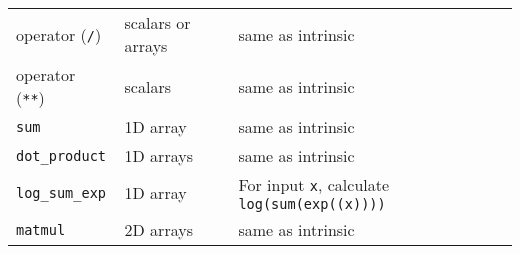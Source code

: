 \documentclass[12pt, reqno, oneside]{amsbook}
\begin{document}
\begin{center}
\begin{tabular}{lll}
operator (\texttt{/}) & scalars or arrays & same as intrinsic\\
operator (\texttt{**}) & scalars & same as intrinsic\\
\texttt{sum} & 1D array & same as intrinsic\\
\texttt{dot\_product} & 1D arrays & same as intrinsic\\
\texttt{log\_sum\_exp} & 1D array & For input \texttt{x}, calculate \texttt{log(sum(exp((x))))}\\
\texttt{matmul} & 2D arrays & same as intrinsic\\
\end{tabular}
\end{center}



\end{document}
